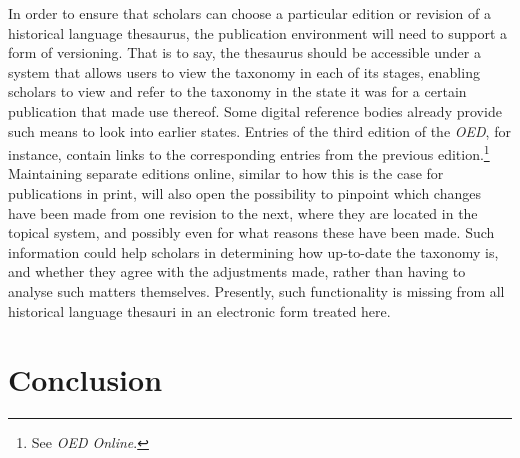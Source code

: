 In order to ensure that scholars can choose a particular edition or revision of a historical language thesaurus, the publication environment will need to support a form of versioning. That is to say, the thesaurus should be accessible under a system that allows users to view the taxonomy in each of its stages, enabling scholars to view and refer to the taxonomy in the state it was for a certain publication that made use thereof. Some digital reference bodies already provide such means to look into earlier states. Entries of the third edition of the \textit{OED}, for instance, contain links to the corresponding entries from the previous edition.\footnote{See \textit{OED Online}.} Maintaining separate editions online, similar to how this is the case for publications in print, will also open the possibility to pinpoint which changes have been made from one revision to the next, where they are located in the topical system, and possibly even for what reasons these have been made. Such information could help scholars in determining how up-to-date the taxonomy is, and whether they agree with the adjustments made, rather than having to analyse such matters themselves. Presently, such functionality is missing from all historical language thesauri in an electronic form treated here.



\section{Conclusion}

